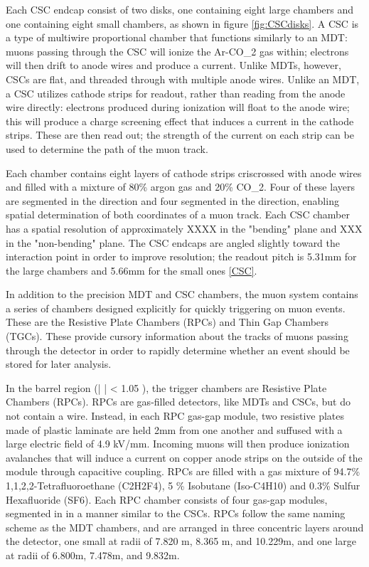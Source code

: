 Each CSC endcap consist of two disks, one containing eight large chambers and one containing eight small chambers, as shown in figure \ref{fig:CSCdisks}. A CSC is a type of multiwire proportional chamber that functions similarly to an MDT: muons passing through the CSC will ionize the Ar-CO_2 gas within; electrons will then drift to anode wires and produce a current. Unlike MDTs, however, CSCs are flat, and threaded through with multiple anode wires. Unlike an MDT, a CSC utilizes cathode strips for readout, rather than reading from the anode wire directly: electrons produced during ionization will float to the anode wire; this will produce a charge screening effect that induces a current in the cathode strips. These are then read out; the strength of the current on each strip can be used to determine the path of the muon track.

Each chamber contains eight layers of cathode strips criscrossed with anode wires and filled with a mixture of 80\% argon gas and 20\% CO_2. Four of these layers are segmented in the \eta direction and four segmented in the \phi direction, enabling spatial determination of both coordinates of a muon track. Each CSC chamber has a spatial resolution of approximately XXXX in the "bending" \eta plane and XXX in the "non-bending" \phi plane. The CSC endcaps are angled slightly toward the interaction point in order to improve resolution; the readout pitch is 5.31mm for the large chambers and 5.66mm for the small ones \ref{CSC}.

In addition to the precision MDT and CSC chambers, the muon system contains a series of chambers designed explicitly for quickly triggering on muon events. These are the Resistive Plate Chambers (RPCs) and Thin Gap Chambers (TGCs). These provide cursory information about the tracks of muons passing through the detector in order to rapidly determine whether an event should be stored for later analysis.

In the barrel region (| \eta | < 1.05 ), the trigger chambers are Resistive Plate Chambers (RPCs). RPCs are gas-filled detectors, like MDTs and CSCs, but do not contain a wire. Instead, in each RPC gas-gap module, two resistive plates made of plastic laminate are held 2mm from one another and suffused with a large electric field of 4.9 kV/mm. Incoming muons will then produce ionization avalanches that will induce a current on copper anode strips on the outside of the module through capacitive coupling. RPCs are filled with a gas mixture of 94.7\% 1,1,2,2-Tetrafluoroethane (C2H2F4), 5 \% Isobutane (Iso-C4H10) and 0.3\% Sulfur Hexafluoride (SF6). Each RPC chamber consists of four gas-gap modules, segmented in \phi in a manner similar to the CSCs. RPCs follow the same naming scheme as the MDT chambers, and are arranged in three concentric layers around the detector, one small at radii of 7.820 m, 8.365 m, and 10.229m, and one large at radii of 6.800m, 7.478m, and 9.832m.


